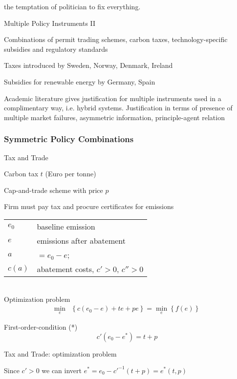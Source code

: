 	the temptation of politician to fix everything.


{Multiple Policy Instruments II}


	Combinations of permit trading schemes, carbon taxes, technology-specific subsidies and regulatory standards

	Taxes introduced by Sweden, Norway, Denmark, Ireland

	Subsidies for renewable energy by Germany, Spain

	Academic literature gives justification for multiple instruments used in a complimentary way, i.e. hybrid systems. Justification in terms of presence of multiple market failures, asymmetric information, principle-agent relation

\subsubsection{Symmetric Policy Combinations}

{Tax and Trade}


	 Carbon tax $t$ (Euro per tonne)

	 Cap-and-trade scheme with price $p$

	 Firm must pay tax and procure certificates for emissions
\begin{tabular}{ll}
$e_0$ & baseline emission \\
$e$ & emissions after abatement \\
$a$ & $=e_0 - e$; \\
$c(a)$ & abatement costs, $c' > 0$, $c'' > 0$ \\
\end{tabular} \\

	 Optimization problem
\begin{align}
\min_{e} & \left\{c(e_0-e)+te+pe\right\} = \min_{e}\left\{f(e)\right\}
\end{align}

	 First-order-condition (*)
\[
c'(e_0-e^*)=t+p
\]



{Tax and Trade: optimization problem}


	 Since $c'>0$ we can invert $e^*=e_0-c'^{-1}(t+p)=e^*(t,p)$ \\

